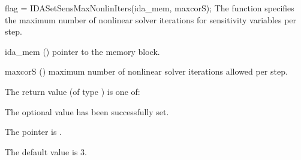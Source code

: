 {
  flag = IDASetSensMaxNonlinIters(ida\_mem, maxcorS);
}
{
  The function  specifies the maximum
  number of nonlinear solver iterations for sensitivity variables per step.
}
{
  \begin{args}
  \item[ida\_mem] ()
    pointer to the {\idas} memory block.
  \item[maxcorS] ()
    maximum number of nonlinear solver iterations allowed per step.
  \end{args}
}
{
  The return value  (of type ) is one of:
  \begin{args}
  \item[\Id{IDA\_SUCCESS}] 
    The optional value has been successfully set.
  \item[\Id{IDA\_MEM\_NULL}]
    The  pointer is .
  \end{args}
}
{
  The default value is $3$.
}

